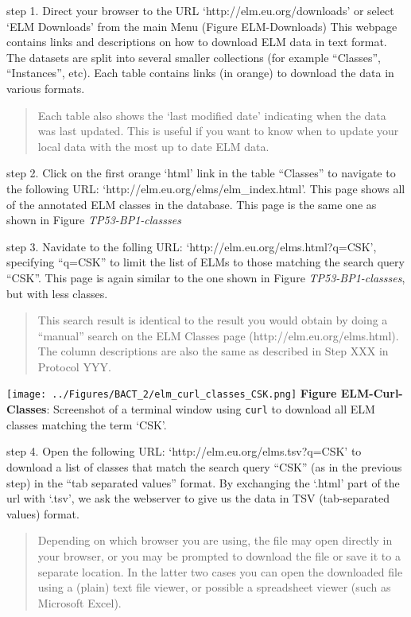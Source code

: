 step 1. Direct your browser to the URL `http://elm.eu.org/downloads' or
select `ELM Downloads' from the main Menu (Figure ELM-Downloads) This
webpage contains links and descriptions on how to download ELM data in
text format. The datasets are split into several smaller collections
(for example ``Classes'', ``Instances'', etc). Each table contains links
(in orange) to download the data in various formats.

\begin{quote}
Each table also shows the `last modified date' indicating when the data
was last updated. This is useful if you want to know when to update your
local data with the most up to date ELM data.
\end{quote}

step 2. Click on the first orange `html' link in the table ``Classes''
to navigate to the following URL:
`http://elm.eu.org/elms/elm\_index.html'. This page shows all of the
annotated ELM classes in the database. This page is the same one as
shown in Figure \emph{TP53-BP1-classses}

step 3. Navidate to the folling URL:
`http://elm.eu.org/elms.html?q=CSK', specifying ``q=CSK'' to limit the
list of ELMs to those matching the search query ``CSK''. This page is
again similar to the one shown in Figure \emph{TP53-BP1-classses}, but
with less classes.

\begin{quote}
This search result is identical to the result you would obtain by doing
a ``manual'' search on the ELM Classes page
(http://elm.eu.org/elms.html). The column descriptions are also the same
as described in Step XXX in Protocol YYY.
\end{quote}

\texttt{[image: ../Figures/BACT\_2/elm\_curl\_classes\_CSK.png]}
\textbf{Figure ELM-Curl-Classes}: Screenshot of a terminal window using
\texttt{curl} to download all ELM classes matching the term `CSK'.

step 4. Open the following URL: `http://elm.eu.org/elms.tsv?q=CSK' to
download a list of classes that match the search query ``CSK'' (as in
the previous step) in the ``tab separated values'' format. By exchanging
the `.html' part of the url with `.tsv', we ask the webserver to give us
the data in TSV (tab-separated values) format.

\begin{quote}
Depending on which browser you are using, the file may open directly in
your browser, or you may be prompted to download the file or save it to
a separate location. In the latter two cases you can open the downloaded
file using a (plain) text file viewer, or possible a spreadsheet viewer
(such as Microsoft Excel).
\end{quote}

